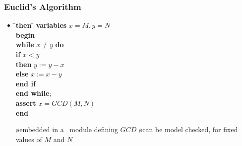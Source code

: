 \documentclass[fleqn]{beamer}
\begin{document}
\begin{frame}
  \frametitle{Euclid's Algorithm}

  \begin{itemize}
  \item {}

    \bigskip

    \hspace*{4em}
    \begin{minipage}{.5\linewidth}\small
    \begin{tabbing}
      \quad\=\quad\=\textbf{then }\=\kill
      \textbf{variables} $x = M, y = N$\\
      \textbf{begin}\\
      \> \textbf{while} $x \neq y$ \textbf{do}\\
      \>\> \textbf{if} $x<y$\\
      \>\> \textbf{then}\> $y := y-x$\\
      \>\> \textbf{else}\> $x := x-y$\\
      \>\> \textbf{end if}\\
      \> \textbf{end while};\\
      \> \textbf{assert} $x = GCD(M,N)$\\
      \textbf{end}
    \end{tabbing}
    \end{minipage}

  \oo {}

    \begin{itemize}
    \o embedded in a \tlaplus\ module defining $GCD$
    \o can be model checked, for fixed values of $M$ and $N$
    \end{itemize}
  \end{itemize}
\end{frame}
\end{document}

